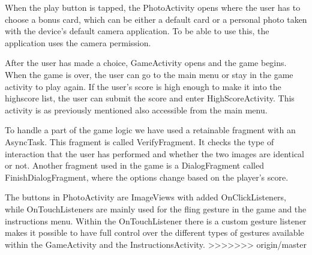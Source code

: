 When the play button is tapped, the PhotoActivity opens where the user has to choose a bonus card, which can be either a default card or a personal photo taken with the device’s default camera application. To be able to use this, the application uses the camera permission. \newline

After the user has made a choice, GameActivity opens and the game begins. When the game is over, the user can go to the main menu or stay in the game activity to play again. If the user’s score is high enough to make it into the highscore list, the user can submit the score and enter HighScoreActivity. This activity is as previously mentioned also accessible from the main menu. \newline

To handle a part of the game logic we have used a retainable fragment with an AsyncTask. This fragment is called VerifyFragment. It checks the type of interaction that the user has performed and whether the two images are identical or not. Another fragment used in the game is a DialogFragment called FinishDialogFragment, where the options change based on the player’s score. \newline

The buttons in PhotoActivity are ImageViews with added OnClickListeners, while OnTouchListeners are mainly used for the fling gesture in the game and the instructions menu. Within the OnTouchListener there is a custom gesture listener makes it possible to have full control over the different types of gestures available within the GameActivity and the InstructionsActivity.
>>>>>>> origin/master
